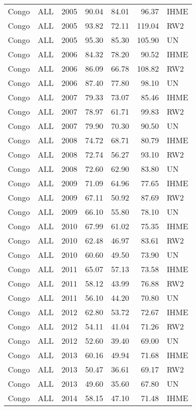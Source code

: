 \begin{longtable}{lllrrrl}
  Congo & ALL & 2005 & 90.04 & 84.01 & 96.37 & IHME \\ 
  Congo & ALL & 2005 & 93.82 & 72.11 & 119.04 & RW2 \\ 
  Congo & ALL & 2005 & 95.30 & 85.30 & 105.90 & UN \\ 
  Congo & ALL & 2006 & 84.32 & 78.20 & 90.52 & IHME \\ 
  Congo & ALL & 2006 & 86.09 & 66.78 & 108.82 & RW2 \\ 
  Congo & ALL & 2006 & 87.40 & 77.80 & 98.10 & UN \\ 
  Congo & ALL & 2007 & 79.33 & 73.07 & 85.46 & IHME \\ 
  Congo & ALL & 2007 & 78.97 & 61.71 & 99.83 & RW2 \\ 
  Congo & ALL & 2007 & 79.90 & 70.30 & 90.50 & UN \\ 
  Congo & ALL & 2008 & 74.72 & 68.71 & 80.79 & IHME \\ 
  Congo & ALL & 2008 & 72.74 & 56.27 & 93.10 & RW2 \\ 
  Congo & ALL & 2008 & 72.60 & 62.90 & 83.80 & UN \\ 
  Congo & ALL & 2009 & 71.09 & 64.96 & 77.65 & IHME \\ 
  Congo & ALL & 2009 & 67.11 & 50.92 & 87.69 & RW2 \\ 
  Congo & ALL & 2009 & 66.10 & 55.80 & 78.10 & UN \\ 
  Congo & ALL & 2010 & 67.99 & 61.02 & 75.35 & IHME \\ 
  Congo & ALL & 2010 & 62.48 & 46.97 & 83.61 & RW2 \\ 
  Congo & ALL & 2010 & 60.60 & 49.50 & 73.90 & UN \\ 
  Congo & ALL & 2011 & 65.07 & 57.13 & 73.58 & IHME \\ 
  Congo & ALL & 2011 & 58.12 & 43.99 & 76.88 & RW2 \\ 
  Congo & ALL & 2011 & 56.10 & 44.20 & 70.80 & UN \\ 
  Congo & ALL & 2012 & 62.80 & 53.72 & 72.67 & IHME \\ 
  Congo & ALL & 2012 & 54.11 & 41.04 & 71.26 & RW2 \\ 
  Congo & ALL & 2012 & 52.60 & 39.40 & 69.00 & UN \\ 
  Congo & ALL & 2013 & 60.16 & 49.94 & 71.68 & IHME \\ 
  Congo & ALL & 2013 & 50.47 & 36.61 & 69.17 & RW2 \\ 
  Congo & ALL & 2013 & 49.60 & 35.60 & 67.80 & UN \\ 
  Congo & ALL & 2014 & 58.15 & 47.10 & 71.48 & IHME \\ 

\end{longtable}
